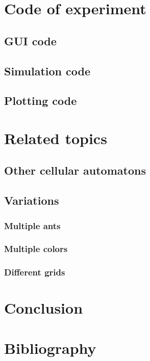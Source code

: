 \documentclass{article}
\begin{document}
\section{Code of experiment}
\subsection{GUI code}
\subsection{Simulation code}
\subsection{Plotting code}

\section{Related topics}
\subsection{Other cellular automatons}
\subsection{Variations}
\subsubsection{Multiple ants}
\subsubsection{Multiple colors}
\subsubsection{Different grids}


\section{Conclusion}


\section{Bibliography}
\end{document}
